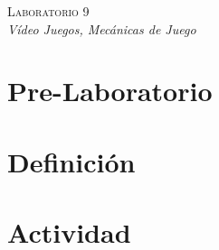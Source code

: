 \begin{center}
\textsc{\Large Laboratorio 9}~\\
\emph{\large Vídeo Juegos, Mecánicas de Juego}
\end{center}

\section{Pre-Laboratorio}

\section{Definición}


\section{Actividad}
